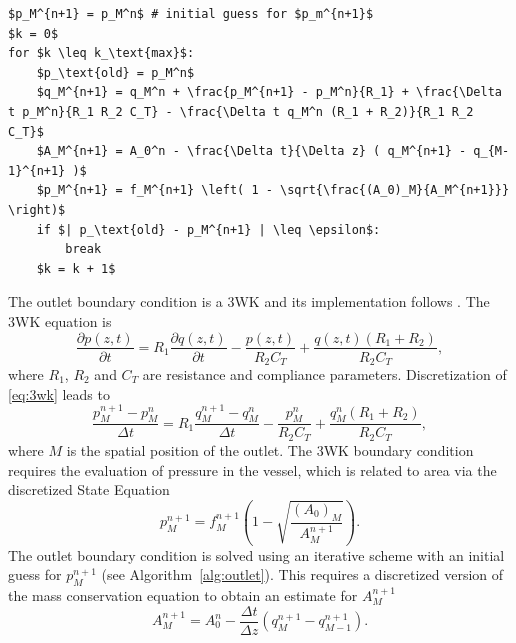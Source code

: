 \documentclass{jors}
\begin{document}
\begin{lstlisting}[frame=single,mathescape,caption={Iterative scheme to determine $\boldsymbol{U}_M^{n+1}$ using a 3WK boundary condition \cite{Kolachalama2007}. An initial guess is made for $p_M^{n+1}$, from which $q_M^{n+1} is calculated using \eqref{eq:3wk}$ and $A_M^{n+1}$ is calculated using the discretized mass conservation equation \eqref{eq:disc_mass}. Using $A_M^{n+1}$ the next iteration of $p_M^{n+1}$ is found via the state equation \eqref{eq:state}. The algorithm stops after $k_\text{max}$ iterations or when the difference between pressure estimates is less than the small threshold value $\epsilon$.}, label=alg:outlet]
$p_M^{n+1} = p_M^n$ # initial guess for $p_m^{n+1}$
$k = 0$
for $k \leq k_\text{max}$:
    $p_\text{old} = p_M^n$
    $q_M^{n+1} = q_M^n + \frac{p_M^{n+1} - p_M^n}{R_1} + \frac{\Delta t p_M^n}{R_1 R_2 C_T} - \frac{\Delta t q_M^n (R_1 + R_2)}{R_1 R_2 C_T}$
    $A_M^{n+1} = A_0^n - \frac{\Delta t}{\Delta z} ( q_M^{n+1} - q_{M-1}^{n+1} )$
    $p_M^{n+1} = f_M^{n+1} \left( 1 - \sqrt{\frac{(A_0)_M}{A_M^{n+1}}} \right)$
    if $| p_\text{old} - p_M^{n+1} | \leq \epsilon$:
        break
    $k = k + 1$
\end{lstlisting}

The outlet boundary condition is a 3WK and its implementation follows \cite{Kolachalama2007}. The 3WK equation is
\begin{equation}\label{eq:3wk}
  \frac{\partial p(z,t)}{\partial t} = R_1 \frac{\partial q(z,t)}{\partial t} - \frac{p(z,t)}{R_2 C_T} + \frac{q(z,t) (R_1 + R_2)}{R_2 C_T},
\end{equation}
where $R_1$, $R_2$ and $C_T$ are resistance and compliance parameters. Discretization of \eqref{eq:3wk} leads to
\begin{equation}
\frac{p_M^{n+1} - p_M^n}{\Delta t} = R_1 \frac{q_M^{n+1} - q_M^n}{\Delta t} - \frac{p_M^n}{R_2 C_T} + \frac{q_M^n (R_1 + R_2)}{R_2 C_T},
\end{equation}
where $M$ is the spatial position of the outlet. The 3WK boundary condition requires the evaluation of pressure in the vessel, which is related to area via the discretized State Equation \cite{Olufsen2000}
\begin{equation}\label{eq:state}
  p_M^{n+1} = f_M^{n+1} \left( 1 - \sqrt{\frac{(A_0)_M}{A_M^{n+1}}} \right).
\end{equation}
The outlet boundary condition is solved using an iterative scheme with an initial guess for $p_M^{n+1}$ (see Algorithm~\ref{alg:outlet}). This requires a discretized version of the mass conservation equation to obtain an estimate for $A_M^{n+1}$
\begin{equation}\label{eq:disc_mass}
A_M^{n+1} = A_0^n - \frac{\Delta t}{\Delta z} \left( q_M^{n+1} - q_{M-1}^{n+1} \right).
\end{equation}
\end{document}
